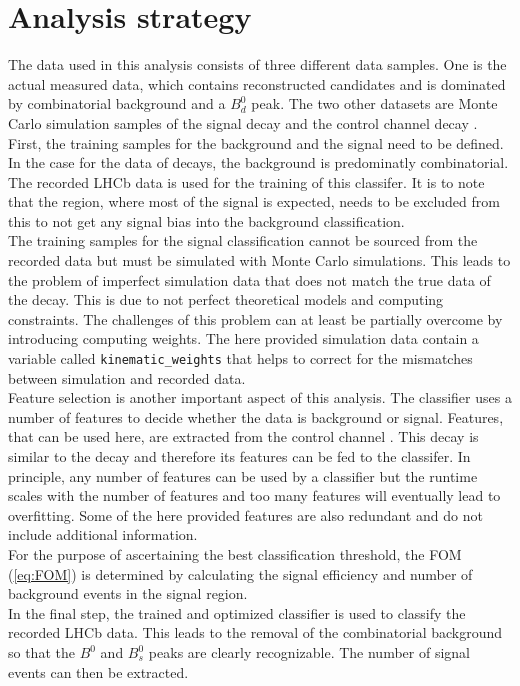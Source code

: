 \section{Analysis strategy}
\label{sec:strategy}
The data used in this analysis consists of three different data samples. One is the actual measured data, which contains reconstructed \printBtoPsiKs \: candidates
and is dominated by combinatorial background and a $B^0_d$ peak. The two other datasets are Monte Carlo simulation samples of the signal decay \printBstoPsiKs \: 
and the control channel decay \printBdtoPsiKs. \\
First, the training samples for the background and the signal need to be defined. In the case for the data of \printBdtoPsiKs \: decays, the background is predominatly combinatorial. The recorded LHCb 
data is used for the training of this classifer. It is to note that the region, where most of the signal is expected, needs to be excluded from this to not get any signal bias into the background classification. \\
The training samples for the signal classification cannot be sourced from the recorded data but must be simulated with Monte Carlo simulations. This leads to the problem of imperfect simulation data 
that does not match the true data of the decay. This is due to not perfect theoretical models and computing constraints. The challenges of this problem can at least be partially overcome by introducing 
computing weights. The here provided simulation data contain a variable called \texttt{kinematic\_weights} that helps to correct for the mismatches between simulation and recorded data. \\
Feature selection is another important aspect of this analysis. The classifier uses a number of features to decide whether the data is background or signal. Features, that can be used here, are extracted
from the control channel \printBtoPsiKs. This decay is similar to the decay \printBstoPsiKs \: and therefore its features can be fed to the classifer.
In principle, any number of features can be used by a classifier but the runtime scales with the number of features and too many features will eventually lead to overfitting. Some of the here provided features
are also redundant and do not include additional information. \\
For the purpose of ascertaining the best classification threshold, the FOM (\autoref{eq:FOM}) is determined by calculating the signal efficiency and number of background events
in the signal region. \\
In the final step, the trained and optimized classifier is used to classify the recorded LHCb data. This leads to the removal of the combinatorial background so that the $B^0$ and $B^0_s$ peaks are clearly
recognizable. The number of signal events can then be extracted. 
